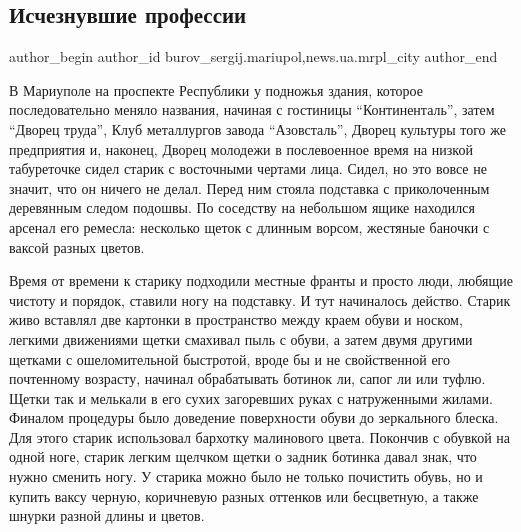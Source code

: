  
 
 
 
 
 
\subsection{Исчезнувшие профессии}
\label{sec:08_04_2017.stz.news.ua.mrpl_city.1.ischeznuvshie_professii}
 
\ifcmt
 author_begin
   author_id burov_sergij.mariupol,news.ua.mrpl_city
 author_end
\fi


В Мариуполе на проспекте Республики у подножья здания, которое последовательно
меняло названия, начиная с гостиницы \enquote{Континенталь}, затем \enquote{Дворец труда}, Клуб
металлургов завода \enquote{Азовсталь}, Дворец культуры того же предприятия и, наконец,
Дворец молодежи в послевоенное время на низкой табуреточке сидел старик с
восточными чертами лица. Сидел, но это вовсе не значит, что он ничего не делал.
Перед ним стояла подставка с приколоченным деревянным следом подошвы. По
соседству на небольшом ящике находился арсенал его ремесла: несколько щеток с
длинным ворсом, жестяные баночки с ваксой разных цветов.

Время от времени к старику подходили местные франты и просто люди, любящие
чистоту и порядок, ставили ногу на подставку. И тут начиналось действо. Старик
живо вставлял две картонки в пространство между краем обуви и носком, легкими
движениями щетки смахивал пыль с обуви, а затем двумя другими щетками с
ошеломительной быстротой, вроде бы и не свойственной его почтенному возрасту,
начинал обрабатывать ботинок ли, сапог ли или туфлю. Щетки так и мелькали в его
сухих загоревших руках с натруженными жилами. Финалом процедуры было доведение
поверхности обуви до зеркального блеска. Для этого старик использовал бархотку
малинового цвета. Покончив с обувкой на одной ноге, старик легким щелчком щетки
о задник ботинка давал знак, что нужно сменить ногу. У старика можно было не
только почистить обувь, но и купить ваксу черную, коричневую разных оттенков
или бесцветную, а также шнурки разной длины и цветов.


